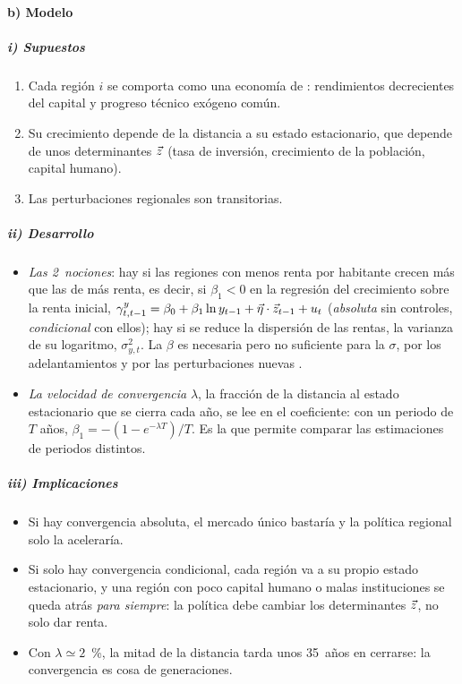 \documentclass[11pt]{article}
\begin{document}
\paragraph{b) Modelo}

\subparagraph{i) Supuestos}

\begin{enumerate}
\item Cada región $i$ se comporta como una economía de : rendimientos decrecientes del capital y progreso técnico exógeno común.
\item Su crecimiento depende de la distancia a su estado estacionario, que depende de unos determinantes $\vec{z}$ (tasa de inversión, crecimiento de la población, capital humano).
\item Las perturbaciones regionales son transitorias.
\end{enumerate}

\subparagraph{ii) Desarrollo}

\begin{itemize}
\item \emph{Las 2~nociones}: hay  si las regiones con menos renta por habitante crecen más que las de más renta, es decir, si $\beta_1<0$ en la regresión del crecimiento sobre la renta inicial, $\gamma^{y}_{t,t-1}=\beta_0+\beta_1\ln y_{t-1}+\vec{\eta}\cdot\vec{z}_{t-1}+u_t$ (\emph{absoluta} sin controles, \emph{condicional} con ellos); hay  si se reduce la dispersión de las rentas, la varianza de su logaritmo, $\sigma^{2}_{y,t}$. La $\beta$ es necesaria pero no suficiente para la $\sigma$, por los adelantamientos y por las perturbaciones nuevas .
\item \emph{La velocidad de convergencia} $\lambda$, la fracción de la distancia al estado estacionario que se cierra cada año, se lee en el coeficiente: con un periodo de $T$ años, $\beta_1=-(1-e^{-\lambda T})/T$. Es la que permite comparar las estimaciones de periodos distintos.
\end{itemize}

\subparagraph{iii) Implicaciones}

\begin{itemize}
\item Si hay convergencia absoluta, el mercado único bastaría y la política regional solo la aceleraría.
\item Si solo hay convergencia condicional, cada región va a su propio estado estacionario, y una región con poco capital humano o malas instituciones se queda atrás \emph{para siempre}: la política debe cambiar los determinantes $\vec{z}$, no solo dar renta.
\item Con $\lambda\simeq2$~\%, la mitad de la distancia tarda unos 35~años en cerrarse: la convergencia es cosa de generaciones.
\end{itemize}
\end{document}
